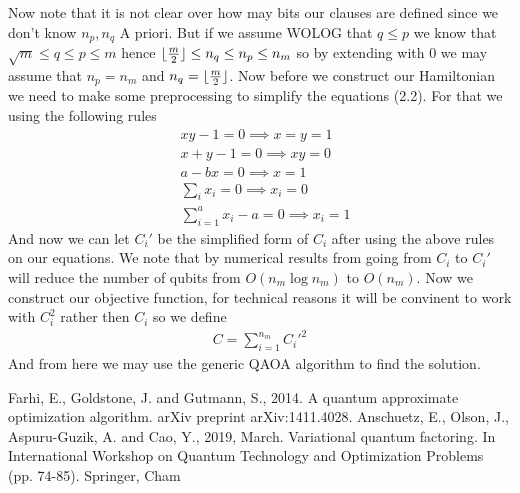 \documentclass[12pt]{amsart}
\numberwithin{equation}{section}
\theoremstyle{definition}
\DeclarePairedDelimiter{\floor}{\lfloor}{\rfloor}
\begin{document}
Now note that it is not clear over how may bits our clauses are defined since we don't know $n_p,n_q$ A priori. But if we assume WOLOG that $q\leq p$ we know that $\sqrt{m}\leq q\leq p\leq m$ hence $\floor{\frac{m}{2}}\leq n_q\leq n_p\leq n_m$ so by extending with $0$ we may  assume that $n_p=n_m$ and $n_q=\floor{\frac{m}{2}}$. Now before we construct our Hamiltonian we need to make some preprocessing to simplify the equations (2.2). For that we using the following rules
\begin{align*}
&xy-1=0\implies x=y=1
\\&x+y-1=0\implies xy=0
\\&a-bx=0 \implies x=1
\\&\sum_{i}x_i=0\implies x_i=0
\\&\sum_{i=1}^a x_i -a=0\implies x_i=1  
\end{align*}   
And now we can let $C_i'$ be the simplified form of $C_i$ after using the above rules on our equations. We note that by numerical results from \cite{VQF} going from $C_i$ to $C_i'$  will reduce the number of qubits from $O(n_m\log n_m)$ to $O(n_m)$. Now we construct our objective function, for technical reasons it will be convinent to work with $C_i^2$ rather then $C_i$ so we define 
\begin{align}
    C=\sum_{i=1}^{n_m} C_i'^2
\end{align}   
And from here we may use the generic QAOA algorithm to find the solution.



















\begin{thebibliography}{99}
%

 Farhi, E., Goldstone, J. and Gutmann, S., 2014. A quantum approximate optimization
algorithm. arXiv preprint arXiv:1411.4028.
Anschuetz, E., Olson, J., Aspuru-Guzik, A. and Cao, Y., 2019, March. Variational quantum
factoring. In International Workshop on Quantum Technology and Optimization Problems (pp.
74-85). Springer, Cham



\end{thebibliography}
\end{document}
